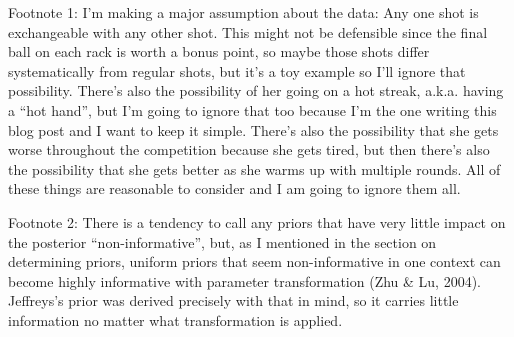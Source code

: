 Footnote 1: I'm making a major assumption about the data: Any one shot is exchangeable with any other shot. This might not be defensible since the final ball on each rack is worth a bonus point, so maybe those shots differ systematically from regular shots, but it's a toy example so I'll ignore that possibility. There's also the possibility of her going on a hot streak, a.k.a. having a “hot hand”, but I'm going to ignore that too because I'm the one writing this blog post and I want to keep it simple. There's also the possibility that she gets worse throughout the competition because she gets tired, but then there's also the possibility that she gets better as she warms up with multiple rounds. All of these things are reasonable to consider and I am going to ignore them all.

Footnote 2: There is a tendency to call any priors that have very little impact on the posterior “non-informative”, but, as I mentioned in the section on determining priors, uniform priors that seem non-informative in one context can become highly informative with parameter transformation (Zhu & Lu, 2004). Jeffreys's prior was derived precisely with that in mind, so it carries little information no matter what transformation is applied.


